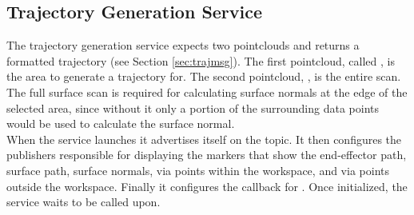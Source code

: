 \subsection{Trajectory Generation  Service}
The trajectory generation service expects two pointclouds and returns a  formatted trajectory (see Section \ref{sec:trajmsg}). The first pointcloud, called , is the area to generate a trajectory for. The second pointcloud, , is the entire scan. The full surface scan is required for calculating surface normals at the edge of the selected area, since without it only a portion of the surrounding data points would be used to calculate the surface normal.\\

When the service launches it advertises itself on the  topic. It then configures the publishers responsible for displaying the markers that show the end-effector path, surface path, surface normals, via points within the workspace, and via points outside the workspace. Finally it configures the callback for . Once initialized, the service waits to be called upon.\\

